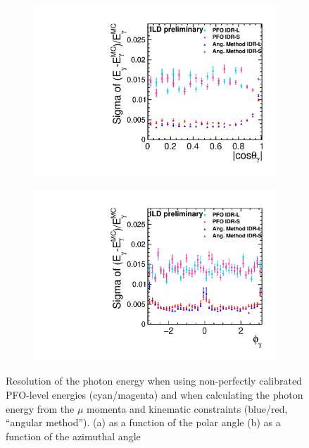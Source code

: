 \begin{figure}[htbp]
\begin{subfigure}{0.49\hsize} 
 \includegraphics[width=\textwidth]{Performance/fig/IDR2EResolutionTheta.pdf}
 \caption{ \label{fig:gammaZ:angles:theta}}
 \end{subfigure}
\begin{subfigure}{0.49\hsize} 
 \includegraphics[width=\textwidth]{Performance/fig/IDR3EResolutionPhi.pdf}
 \caption{  \label{fig:gammaZ:angles:phi}}
 \end{subfigure}
\caption{
Resolution of the photon energy when using non-perfectly calibrated PFO-level energies (cyan/magenta) and when calculating the photon energy from the $\mu$ momenta and kinematic constraints (blue/red, ``angular method'').  
(a) as a function of the polar angle
(b) as a function of the azimuthal angle
}
\label{fig:gammaZ:angles}
\end{figure}

